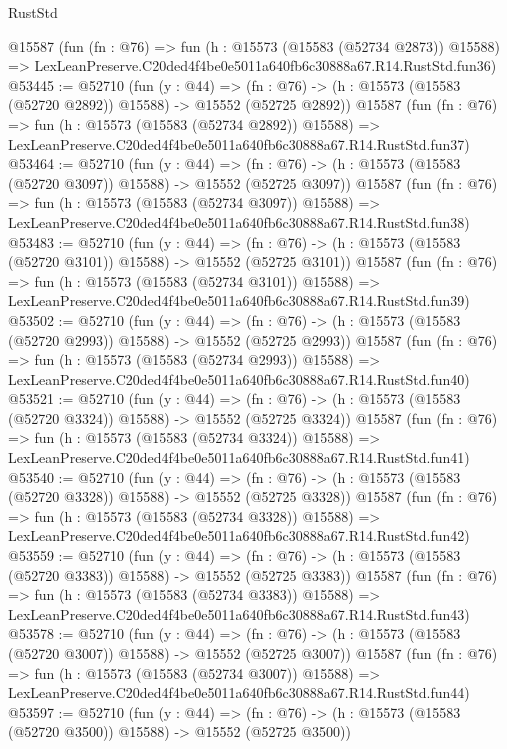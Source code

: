 \begin{lexlean}{RustStd}
\begin{coremodule}
    @15587
    (fun (fn : @76) =>
    fun (h : @15573 (@15583 (@52734 @2873)) @15588) =>
    LexLeanPreserve.C20ded4f4be0e5011a640fb6c30888a67.R14.RustStd.fun36)
@53445 := @52710
    (fun (y : @44) =>
    (fn : @76) -> (h : @15573 (@15583 (@52720 @2892)) @15588) -> @15552 (@52725 @2892))
    @15587
    (fun (fn : @76) =>
    fun (h : @15573 (@15583 (@52734 @2892)) @15588) =>
    LexLeanPreserve.C20ded4f4be0e5011a640fb6c30888a67.R14.RustStd.fun37)
@53464 := @52710
    (fun (y : @44) =>
    (fn : @76) -> (h : @15573 (@15583 (@52720 @3097)) @15588) -> @15552 (@52725 @3097))
    @15587
    (fun (fn : @76) =>
    fun (h : @15573 (@15583 (@52734 @3097)) @15588) =>
    LexLeanPreserve.C20ded4f4be0e5011a640fb6c30888a67.R14.RustStd.fun38)
@53483 := @52710
    (fun (y : @44) =>
    (fn : @76) -> (h : @15573 (@15583 (@52720 @3101)) @15588) -> @15552 (@52725 @3101))
    @15587
    (fun (fn : @76) =>
    fun (h : @15573 (@15583 (@52734 @3101)) @15588) =>
    LexLeanPreserve.C20ded4f4be0e5011a640fb6c30888a67.R14.RustStd.fun39)
@53502 := @52710
    (fun (y : @44) =>
    (fn : @76) -> (h : @15573 (@15583 (@52720 @2993)) @15588) -> @15552 (@52725 @2993))
    @15587
    (fun (fn : @76) =>
    fun (h : @15573 (@15583 (@52734 @2993)) @15588) =>
    LexLeanPreserve.C20ded4f4be0e5011a640fb6c30888a67.R14.RustStd.fun40)
@53521 := @52710
    (fun (y : @44) =>
    (fn : @76) -> (h : @15573 (@15583 (@52720 @3324)) @15588) -> @15552 (@52725 @3324))
    @15587
    (fun (fn : @76) =>
    fun (h : @15573 (@15583 (@52734 @3324)) @15588) =>
    LexLeanPreserve.C20ded4f4be0e5011a640fb6c30888a67.R14.RustStd.fun41)
@53540 := @52710
    (fun (y : @44) =>
    (fn : @76) -> (h : @15573 (@15583 (@52720 @3328)) @15588) -> @15552 (@52725 @3328))
    @15587
    (fun (fn : @76) =>
    fun (h : @15573 (@15583 (@52734 @3328)) @15588) =>
    LexLeanPreserve.C20ded4f4be0e5011a640fb6c30888a67.R14.RustStd.fun42)
@53559 := @52710
    (fun (y : @44) =>
    (fn : @76) -> (h : @15573 (@15583 (@52720 @3383)) @15588) -> @15552 (@52725 @3383))
    @15587
    (fun (fn : @76) =>
    fun (h : @15573 (@15583 (@52734 @3383)) @15588) =>
    LexLeanPreserve.C20ded4f4be0e5011a640fb6c30888a67.R14.RustStd.fun43)
@53578 := @52710
    (fun (y : @44) =>
    (fn : @76) -> (h : @15573 (@15583 (@52720 @3007)) @15588) -> @15552 (@52725 @3007))
    @15587
    (fun (fn : @76) =>
    fun (h : @15573 (@15583 (@52734 @3007)) @15588) =>
    LexLeanPreserve.C20ded4f4be0e5011a640fb6c30888a67.R14.RustStd.fun44)
@53597 := @52710
    (fun (y : @44) =>
    (fn : @76) -> (h : @15573 (@15583 (@52720 @3500)) @15588) -> @15552 (@52725 @3500))

\end{coremodule}
\end{lexlean}
